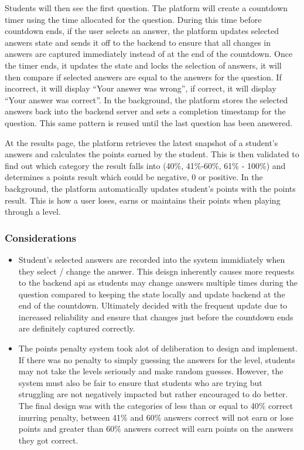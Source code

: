 Students will then see the first question. The platform will create a countdown timer using the time allocated for the question. During this time before countdown ends, if the user selects an answer, the platform updates selected answers state and sends it off to the backend to ensure that all changes in answers are captured immediately instead of at the end of the countdown. Once the timer ends, it updates the state and locks the selection of answers, it will then compare if selected answers are equal to the answers for the question. If incorrect, it will display “Your answer was wrong”, if correct, it will display “Your answer was correct”. In the background, the platform stores the selected answers back into the backend server and sets a completion timestamp for the question. This same pattern is reused until the last question has been answered. 

\newpage

At the results page, the platform retrieves the latest snapshot of a student's answers and calculates the points earned by the student. This is then validated to find out which category the result falls into (40\%, 41\%-60\%, 61\% - 100\%) and determines a points result which could be negative, 0 or positive. In the background, the platform automatically updates student’s points with the points result. This is how a user loses, earns or maintains their points when playing through a level.

\subsubsection{Considerations}
\begin{itemize}
    \item Student's selected answers are recorded into the system immidiately when they select / change the answer. This deisgn inherently causes more requests to the backend api as students may change answers multiple times during the question compared to keeping the state locally and update backend at the end of the countdown. Ultimately decided with the frequent update due to increased reliability and ensure that changes just before the countdown ends are definitely captured correctly.
    \item The points penalty system took alot of deliberation to design and implement. If there was no penalty to simply guessing the answers for the level, students may not take the levels seriously and make random guesses. However, the system must also be fair to ensure that students who are trying but struggling are not negatively impacted but rather encouraged to do better. The final design was with the categories of less than or equal to 40\% correct inurring penalty, between 41\% and 60\% answers correct will not earn or lose points and greater than 60\% answers correct will earn points on the answers they got correct.
\end{itemize}

